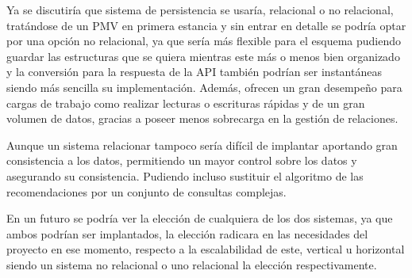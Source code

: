 Ya se discutiría que sistema de persistencia se usaría, relacional o no relacional, tratándose de un PMV en primera 
estancia y sin entrar en detalle se podría optar por una opción no relacional, ya que sería más flexible para el esquema 
pudiendo guardar las estructuras que se quiera mientras este más o menos bien organizado y la conversión para la 
respuesta de la API también podrían ser instantáneas siendo más sencilla su implementación. Además, ofrecen un gran 
desempeño para cargas de trabajo como realizar lecturas o escrituras rápidas y de un gran volumen de datos, gracias a 
poseer menos sobrecarga en la gestión de relaciones.

Aunque un sistema relacionar tampoco sería difícil de implantar aportando gran consistencia a los datos, permitiendo un 
mayor control sobre los datos y asegurando su consistencia. Pudiendo incluso sustituir el algoritmo de las 
recomendaciones por un conjunto de consultas complejas.

En un futuro se podría ver la elección de cualquiera de los dos sistemas, ya que ambos podrían ser implantados, la 
elección radicara en las necesidades del proyecto en ese momento, respecto a la escalabilidad de este, vertical u 
horizontal siendo un sistema no relacional o uno relacional la elección respectivamente.

